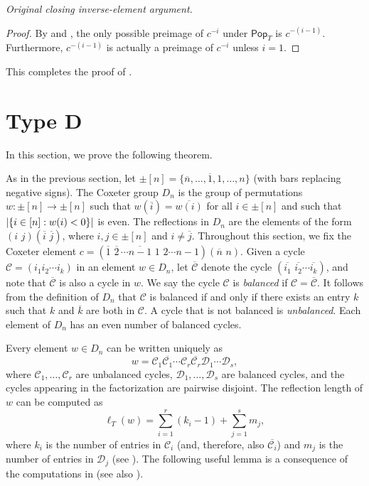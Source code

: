 \documentclass[10pt,a4paper]{amsart}
\newcommand{\darkblue}{\color{darkblue}}
\newcommand{\defn}[1]{\emph{\darkblue #1}}
\newcommand{\pop}{\mathsf{Pop}}
\DeclarePairedDelimiter\abs{\lvert}{\rvert}
\begin{document}
\noindent\textit{Original closing inverse-element argument.}
\begin{proof}
  By  and , the only possible preimage of $c^{-i}$ under $\pop_T$ is $c^{-(i-1)}$.  Furthermore, $c^{-(i-1)}$ is actually a preimage of $c^{-i}$ unless $i=1$.
\end{proof}

This completes the proof of .

\setcounter{section}{5}
\section{Type D}
\label{sec:typed}
In this section, we prove the following theorem.

\setcounter{theorem}{1}
As in the previous section, let $\pm[n]=\{\overline n,\ldots,\overline 1,1,\ldots,n\}$ (with bars replacing negative signs). The Coxeter group $D_n$ is the group of permutations $w:\pm[n]\to\pm[n]$ such that $w(\overline i)=\overline{w(i)}$ for all $i\in\pm[n]$ and such that $\abs{\{i\in[n]:w(i)<0\}}$ is even. The reflections in $D_n$ are the elements of the form $(i\,\,j)(\overline i\,\,\overline j)$, where $i,j\in\pm[n]$ and $i\neq\overline j$. Throughout this section, we fix the Coxeter element 
$c=(\overline 1\,\,\overline 2\,\cdots\overline{n-1}\,\,1\,\,2\cdots n-1)(\overline n\,\,n)$. Given a cycle $\mathcal C=(i_1i_2\cdots i_k)$ in an element $w\in D_n$, let $\overline{\mathcal C}$ denote the cycle $(\overline{i_1}\,\,\overline{i_2}\cdots \overline{i_k})$, and note that $\overline{\mathcal C}$ is also a cycle in $w$. We say the cycle $\mathcal C$ is \defn{balanced} if $\mathcal C=\overline{\mathcal C}$. It follows from the definition of $D_n$ that $\mathcal C$ is balanced if and only if there exists an entry $k$ such that $k$ and $\overline k$ are both in $\mathcal C$. A cycle that is not balanced is \defn{unbalanced}. Each element of $D_n$ has an even number of balanced cycles. 

Every element $w\in D_n$ can be written uniquely as 
\[
w=\mathcal C_1\overline{\mathcal C_1}\cdots\mathcal C_r\overline{\mathcal C_r}\mathcal D_1\cdots\mathcal D_s,
\]
 where $\mathcal C_1,\ldots,\mathcal C_r$ are unbalanced cycles, $\mathcal D_1,\ldots,\mathcal D_s$ are balanced cycles, and the cycles appearing in the factorization are pairwise disjoint. The reflection length of $w$ can be computed as 
\[
\ell_T(w)=\sum_{i=1}^r(k_i-1)+\sum_{j=1}^sm_j,
\]
 where $k_i$ is the number of entries in $\mathcal C_i$ (and, therefore, also $\overline{\mathcal C_i}$) and $m_j$ is the number of entries in $\mathcal D_j$ (see \cite[Section~3]{BradyWatt}). The following useful lemma is a consequence of the computations in \cite[Example~3.6]{BradyWatt} (see also \cite[Section~3]{AthanasiadisReiner}).
\end{document}
